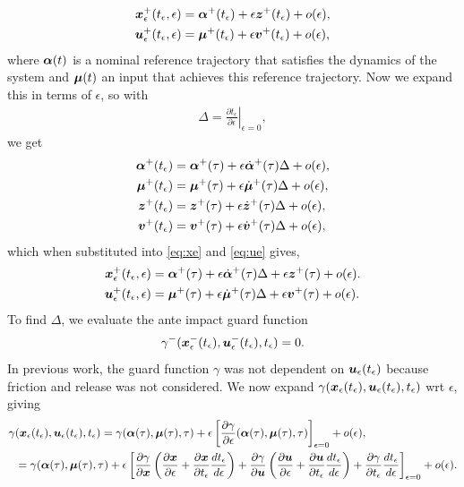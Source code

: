 \documentclass[../DC2017114Bouma.tex]{subfiles}
\begin{document}
\begin{align}
{\boldsymbol{x}}^{+}_\epsilon(t_\epsilon,\epsilon) &= \boldsymbol{\alpha}^{+}(t_\epsilon) + \epsilon {\boldsymbol{z}}^{+}(t_\epsilon) + o(\epsilon),\label{eq:xe}\\
{\boldsymbol{u}}^{+}_\epsilon(t_\epsilon,\epsilon) &= \boldsymbol{\mu}^{+}(t_\epsilon) + \epsilon {\boldsymbol{v}}^{+}(t_\epsilon) + o(\epsilon),\label{eq:ue}
\end{align}
where $\boldsymbol{\alpha}(t)$ is a nominal reference trajectory that satisfies the dynamics of the system and $\boldsymbol{\mu}(t)$ an input that achieves this reference trajectory. Now we expand this in terms of $\epsilon$, so with
\begin{align}
\Delta = \left.\frac{\partial t_\epsilon}{\partial\epsilon}\right|_{\epsilon=0},
\end{align} 
we get
\begin{align}
\boldsymbol{\alpha}^{+}(t_\epsilon) &= \boldsymbol{\alpha}^{+}(\tau) + \epsilon \dot{\boldsymbol{\alpha}}^{+}(\tau)\Delta + o(\epsilon),\\
\boldsymbol{\mu}^{+}(t_\epsilon) &= \boldsymbol{\mu}^{+}(\tau) + \epsilon \dot{\boldsymbol{\mu}}^{+}(\tau)\Delta + o(\epsilon),\\
{\boldsymbol{z}}^{+}(t_\epsilon) &= {\boldsymbol{z}}^{+}(\tau) + \epsilon \dot{{\boldsymbol{z}}}^{+}(\tau)\Delta + o(\epsilon),\\
{\boldsymbol{v}}^{+}(t_\epsilon) &= {\boldsymbol{v}}^{+}(\tau) + \epsilon \dot{{\boldsymbol{v}}}^{+}(\tau)\Delta + o(\epsilon),
\end{align}
which when substituted into \eqref{eq:xe} and \eqref{eq:ue} gives,
\begin{align}
{\boldsymbol{x}}^{+}_\epsilon(t_\epsilon,\epsilon) &= \boldsymbol{\alpha}^{+}(\tau) + \epsilon \dot{\boldsymbol{\alpha}}^{+}(\tau)\Delta + \epsilon {\boldsymbol{z}}^{+}(\tau) + o(\epsilon). \label{eq:xeexp}\\
{\boldsymbol{u}}^{+}_\epsilon(t_\epsilon,\epsilon) &= \boldsymbol{\mu}^{+}(\tau) + \epsilon \dot{\boldsymbol{\mu}}^{+}(\tau)\Delta + \epsilon {\boldsymbol{v}}^{+}(\tau) + o(\epsilon). \label{eq:ueexp}
\end{align}
 To find $\Delta$, we evaluate the ante impact guard function
\begin{align}
\gamma^{-}( {\boldsymbol{x}}^{-}_\epsilon(t_\epsilon),{\boldsymbol{u}}^{-}_\epsilon(t_\epsilon),t_\epsilon) = 0.
\end{align}
In previous work, the guard function $\gamma$ was not dependent on ${\boldsymbol{u}}_\epsilon(t_\epsilon)$ because friction and release was not considered. We now expand $\gamma({\boldsymbol{x}}_\epsilon(t_\epsilon),{\boldsymbol{u}}_\epsilon(t_\epsilon),t_\epsilon)$ wrt $\epsilon$, giving
\begin{align}
\gamma&({\boldsymbol{x}}_\epsilon(t_\epsilon),{\boldsymbol{u}}_\epsilon(t_\epsilon),t_\epsilon) = \gamma( \boldsymbol{\alpha}(\tau), \boldsymbol{\mu}(\tau),\tau) + \epsilon\left[\frac{\partial \gamma}{\partial\epsilon}(\boldsymbol{\alpha}(\tau),\boldsymbol{\mu}(\tau),\tau)\right]_{\epsilon=0} + o(\epsilon),\\
&= \gamma( \boldsymbol{\alpha}(\tau), \boldsymbol{\mu}(\tau),\tau) + \epsilon\left[ \frac{\partial\gamma}{\partial{\boldsymbol{x}}}\left(\frac{\partial{\boldsymbol{x}}}{\partial\epsilon} + \frac{\partial{\boldsymbol{x}}}{\partial t_\epsilon}\frac{d t_\epsilon}{d\epsilon}\right) + \frac{\partial\gamma}{\partial{\boldsymbol{u}}}\left(\frac{\partial{\boldsymbol{u}}}{\partial\epsilon} + \frac{\partial{\boldsymbol{u}}}{\partial t_\epsilon}\frac{d t_\epsilon}{d\epsilon}\right) + \frac{\partial\gamma}{\partial t_\epsilon}\frac{d t_\epsilon}{d\epsilon}  \right]_{\epsilon=0} + o(\epsilon). \label{eq:gamma}
\end{align}
\end{document}
